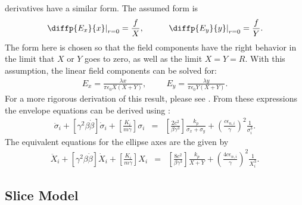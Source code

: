 derivatives have a similar form. The assumed form is
%
\begin{eqnarray}
\left.\diffp{E_x}{x}\right|_{r=0} = \frac{f}{X},\hspace{1cm} \left.\diffp{E_y}{y}\right|_{r=0}=\frac{f}{Y}.
\end{eqnarray}
%
The form here is chosen so that the field components have the right behavior in
the limit that $X$ or $Y$ goes to zero, as well as the limit $X=Y=R$. With this
assumption, the linear field components can be solved for:
%
\begin{eqnarray}
E_x = \frac{\lambda x}{\pi\epsilon_0X(X+Y)},\hspace{1cm} E_y = \frac{\lambda y}{\pi\epsilon_0Y(X+Y)}.
\end{eqnarray}
%
For a more rigorous derivation of this result, please see \cite{Sach}.
From these expressions the envelope equations can be derived using :
%
\begin{eqnarray}
\ddot\sigma_i + \left[\gamma^2\beta\dot\beta\right]\dot\sigma_i
+ \left[\frac{K_i}{m\gamma}\right]\sigma_i &=& \left[\frac{2c^2}{\beta\gamma^3}\right]\frac{k_p}{\sigma_x+\sigma_y}+\left(\frac{c\epsilon_{n,i}}{\gamma}\right)^2\frac{1}{\sigma_i^3}.
\end{eqnarray}
%
The equivalent equations for the ellipse axes are the given by
%
\begin{eqnarray}
\ddot X_i + \left[\gamma^2\beta\dot\beta\right]\dot X_i
+ \left[\frac{K_i}{m\gamma}\right]X_i &=& \left[\frac{8c^2}{\beta\gamma^3}\right]\frac{k_p}{X+Y}+\left(\frac{4c\epsilon_{n,i}}{\gamma}\right)^2\frac{1}{X_i^3}.
\end{eqnarray}

\subsection{Slice Model}

